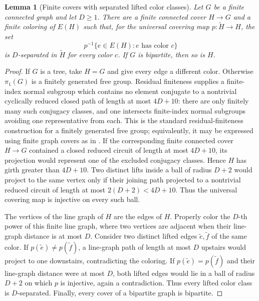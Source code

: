 \documentclass[11pt]{amsart}
\theoremstyle{plain}
\newtheorem{lemma}[theorem]{Lemma}
\theoremstyle{definition}
\theoremstyle{remark}
\begin{document}
\begin{lemma}[Finite covers with separated lifted color classes]
\label{lem:separated-lift-coloring}
Let \(G\) be a finite connected graph and let \(D\geq1\).  There are a
finite connected cover \(H\to G\) and a finite coloring of \(E(H)\) such
that, for the universal covering map \(p:\widetilde H\to H\), the set
\[
  p^{-1}\{e\in E(H):e\text{ has color }c\}
\]
is \(D\)-separated in \(\widetilde H\) for every color \(c\).
If \(G\) is bipartite, then so is \(H\).
\end{lemma}

\begin{proof}
If \(G\) is a tree, take \(H=G\) and give every edge a different color.
Otherwise \(\pi_1(G)\) is a finitely generated free group.  Residual
finiteness supplies a finite-index normal subgroup which contains no element
conjugate to a nontrivial cyclically reduced closed path of length at most
\(4D+10\): there are only finitely many such conjugacy classes, and one
intersects finite-index normal subgroups avoiding one representative from
each.  This is the standard residual-finiteness construction for a
finitely generated free group; equivalently, it may be expressed using
finite graph covers as in \cite{Stallings1983}.  If the corresponding finite
connected cover \(H\to G\) contained a closed reduced circuit of length at
most \(4D+10\), its projection would represent one of the excluded
conjugacy classes.  Hence \(H\) has girth greater than \(4D+10\).  Two
distinct lifts inside a ball of radius \(D+2\) would project to the same
vertex only if their joining path projected to a nontrivial reduced circuit
of length at most \(2(D+2)<4D+10\).  Thus the universal covering map is
injective on every such ball.

The vertices of the line graph of \(H\) are the edges of \(H\).  Properly
color the \(D\)-th power of this finite line graph, where two vertices are
adjacent when their line-graph distance is at most \(D\).  Consider two
distinct lifted edges \(\widetilde e,\widetilde f\) of the same color.  If
\(p(\widetilde e)\neq p(\widetilde f)\), a line-graph path of length at most
\(D\) upstairs would project to one downstairs, contradicting the coloring.
If \(p(\widetilde e)=p(\widetilde f)\) and their line-graph distance were at
most \(D\), both lifted edges would lie in a ball of radius \(D+2\) on which
\(p\) is injective, again a contradiction.  Thus every lifted color class is
\(D\)-separated.  Finally, every cover of a bipartite graph is bipartite.
\end{proof}
\end{document}
